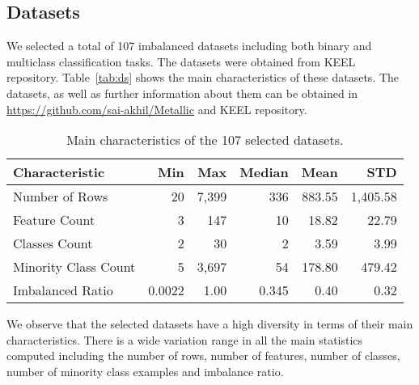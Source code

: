 \documentclass{article}
\begin{document}
\subsection{Datasets}
We selected a total of 107 imbalanced datasets including both binary and multiclass classification tasks. The datasets were obtained from KEEL~\cite{alcala-fdezKEELDataMiningSoftware2011} repository. Table~\autoref{tab:ds} shows the main characteristics of these datasets. The datasets, as well as further information about them can be obtained in \url{https://github.com/sai-akhil/Metallic} and KEEL repository.


\begin{table}[ht]
\centering
\begin{tabular}{lrrrrr}
\toprule
Characteristic & Min & Max & Median & Mean & STD \\
\midrule
Number of Rows & 20 & 7,399 & 336 & 883.55 & 1,405.58 \\
Feature Count & 3 & 147 & 10 & 18.82 & 22.79 \\
Classes Count & 2 & 30 & 2 & 3.59 & 3.99 \\
Minority Class Count & 5 & 3,697 & 54 & 178.80 & 479.42 \\
Imbalanced Ratio & 0.0022 & 1.00 & 0.345 & 0.40 & 0.32 \\
\bottomrule
\end{tabular}
\captionsetup{justification=centering}
\caption{Main characteristics of the 107 selected datasets.}\label{tab:ds}
\end{table}


We observe that the selected datasets have a high diversity in terms of their main characteristics. There is a wide variation range in all the main statistics computed including the number of rows, number of features, number of classes, number of minority class examples and imbalance ratio.
\end{document}
